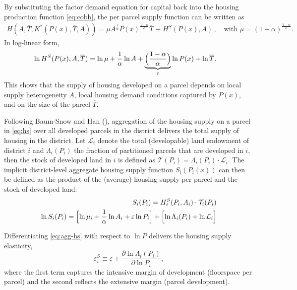 \documentclass[
  12pt,
]{article}
\begin{document}
By substituting the factor demand equation for capital back into the housing production function \eqref{eq:cobb}, the per parcel supply function can be written as \[
\begin{aligned}
H(A, \overline{T}, K^*(P(x), \overline{T}, A))=\mu A^{\frac{1}{\alpha}}{P(x)}^{\frac{1-\alpha}{\alpha}}\overline{T} \equiv H^S(P(x), A)\,,\quad \text{with } \mu = (1-\alpha)^{\frac{1-\alpha}{\alpha}}.\end{aligned}\,\] In log-linear form, \begin{align}
\ln H^S(P(x), A, \overline{T}) &= \ln \mu + \frac{1}{\alpha}\ln A + \underbrace{\Bigl(\frac{1-\alpha}{\alpha}\Bigr)}_{\varepsilon}\ln P(x) + \ln \overline{T}.
\label{eq:hs}
\end{align} This shows that the supply of housing developed on a parcel depends on local supply heterogeneity \(A\), local housing demand conditions captured by \(P(x)\), and on the size of the parcel \(\overline{T}\).

Following Baum-Snow and Han (), aggregation of the housing supply on a parcel in \eqref{eq:hs} over all developed parcels in the district delivers the total supply of housing in the district. Let \(\mathcal{L}_{i}\) denote the total (developable) land endowment of district \(i\) and \(\Lambda_i (P_i)\) the fraction of partitioned parcels that are developed in \(i\), then the stock of developed land in \(i\) is defined as \(\mathcal{T}(P_i) = \Lambda_i(P_i) \cdot \mathcal{L}_{i}\). The implicit district-level aggregate housing supply function \(S_i(P_i(x))\) can then be defined as the product of the (average) housing supply per parcel and the stock of developed land: \begin{align}
S_i(P_i) = H_i^S(P_i, A_i)\cdot \mathcal{T}_{i}(P_i)\\ 
\ln S_i(P_i) = \Bigl[\ln \mu_i + \frac{1}{\alpha}\ln A_i + \varepsilon\ln P_i \Bigr]+ \Bigl[\ln\Lambda_i(P_i) + \ln\mathcal{L}_i\Bigr]
\label{eq:agg-hs}
\end{align}

Differentiating \eqref{eq:agg-hs} with respect to \(\ln P\) delivers the housing supply elasticity, \begin{equation}
\varepsilon^S_{i} \equiv \varepsilon + \frac{\partial \ln\Lambda_i(P_i)}{\partial \ln P_i},
\label{eq:elasticity}
\end{equation} where the first term captures the intensive margin of development (floorspace per parcel) and the second reflects the extensive margin (parcel development).
\end{document}
